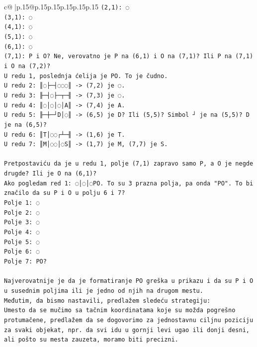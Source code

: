 \documentclass{article}
\begin{document}
{\begin{supertabular}{c@{$\;$}|p{.15\linewidth}@{}p{.15\linewidth}p{.15\linewidth}p{.15\linewidth}p{.15\linewidth}p{.15\linewidth}}
{{{\texttt{(2,1): ◌} \\
\texttt{(3,1): ◌} \\
\texttt{(4,1): ◌} \\
\texttt{(5,1): ◌} \\
\texttt{(6,1): ◌} \\
\texttt{(7,1): P i O? Ne, verovatno je P na (6,1) i O na (7,1)? Ili P na (7,1) i O na (7,2)?} \\
\texttt{U redu 1, poslednja ćelija je PO. To je čudno.} \\
\texttt{U redu 2: ║◌├─┤◌◌◌║ {-}> (7,2) je ◌.} \\
\texttt{U redu 3: ╟─┤◌├─┬─╢ {-}> (7,3) je ◌.} \\
\texttt{U redu 4: ║◌│◌│◌│A║ {-}> (7,4) je A.} \\
\texttt{U redu 5: ╟─┼─┘D│◌║ {-}> (6,5) je D? Ili (5,5)? Simbol ┘ je na (5,5)? D je na (6,5)?} \\
\texttt{U redu 6: ║T│◌◌┌┴─╢ {-}> (1,6) je T.} \\
\texttt{U redu 7: ║M│◌◌│◌S║ {-}> (1,7) je M, (7,7) je S.} \\
\\ 
\texttt{Pretpostaviću da je u redu 1, polje (7,1) zapravo samo P, a O je negde drugde? Ili je O na (6,1)?} \\
\texttt{Ako pogledam red 1: ◌│◌│◌PO. To su 3 prazna polja, pa onda "PO". To bi značilo da su P i O u polju 6 i 7?} \\
\texttt{Polje 1: ◌} \\
\texttt{Polje 2: ◌} \\
\texttt{Polje 3: ◌} \\
\texttt{Polje 4: ◌} \\
\texttt{Polje 5: ◌} \\
\texttt{Polje 6: ◌} \\
\texttt{Polje 7: PO?} \\
\\ 
\texttt{Najverovatnije je da je formatiranje PO greška u prikazu i da su P i O u susednim poljima ili je jedno od njih na drugom mestu.} \\
\texttt{Međutim, da bismo nastavili, predlažem sledeću strategiju:} \\
\texttt{Umesto da se mučimo sa tačnim koordinatama koje su možda pogrešno protumačene, predlažem da se dogovorimo za jednostavnu ciljnu poziciju za svaki objekat, npr. da svi idu u gornji levi ugao ili donji desni, ali pošto su mesta zauzeta, moramo biti precizni.} \\
\\ 
}}}
\end{supertabular}}
\end{document}
